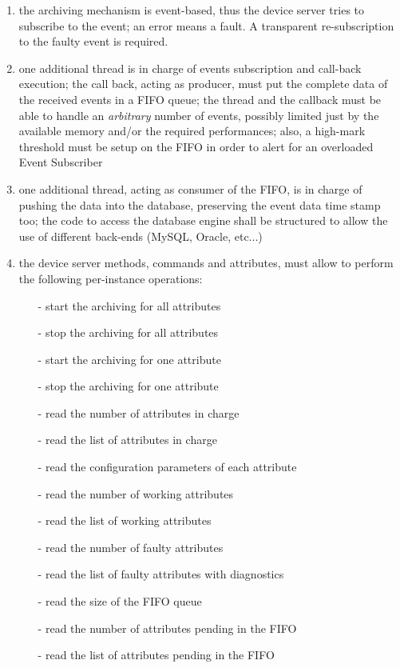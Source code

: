 \documentclass[11pt,a4paper]{article}
\begin{document}
\begin{enumerate}
	\item the archiving mechanism is event-based, thus the device
			  server tries to subscribe to the event; an error means
				a fault. A transparent re-subscription to the faulty event
				is required.
	\item one additional thread is in charge of events subscription
				and call-back execution; the call back, acting as producer,
				must put the complete data of the received events in a FIFO
				queue; the thread and the callback must be able to handle an
				\emph{arbitrary} number of events, possibly limited just by the
				available memory and/or the required performances; also,
				a high-mark threshold must be setup on the FIFO in order
				to alert for an overloaded Event Subscriber
	\item one additional thread, acting as consumer of the FIFO, is
				in charge of pushing the data into the database, preserving
				the event data time stamp too; the code to access the database
				engine shall be structured to allow the use of different
				\mbox{back-ends} (MySQL, Oracle, etc...)
	\item the device server methods, commands and attributes, must allow
				to perform the following \mbox{per-instance} operations:
				\begin{itemize}
					\item[-] start the archiving for all attributes
					\item[-] stop the archiving for all attributes
					\item[-] start the archiving for one attribute
					\item[-] stop the archiving for one attribute
					\item[-] read the number of attributes in charge
					\item[-] read the list of attributes in charge
					\item[-] read the configuration parameters of each attribute
					\item[-] read the number of working attributes
					\item[-] read the list of working attributes
					\item[-] read the number of faulty attributes
					\item[-] read the list of faulty attributes with diagnostics
					\item[-] read the size of the FIFO queue
					\item[-] read the number of attributes pending in the FIFO
					\item[-] read the list of attributes pending in the FIFO
				\end{itemize}
\end{enumerate}
\end{document}
